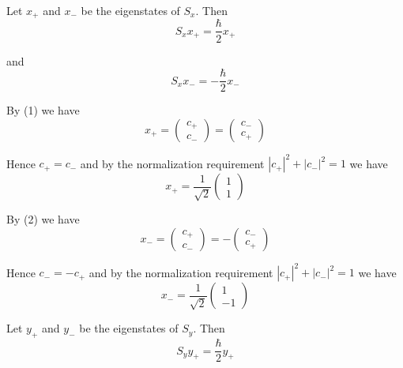 


\bigskip
Let $x_+$ and $x_-$ be the eigenstates of $S_x$. Then
\begin{equation*}
S_xx_+=\frac{\hbar}{2}x_+
\tag{1}
\end{equation*}

and
\begin{equation*}
S_xx_-=-\frac{\hbar}{2}x_-
\tag{2}
\end{equation*}

By (1) we have
\begin{equation*}
x_+=\begin{pmatrix}c_+\\c_-\end{pmatrix}=\begin{pmatrix}c_-\\c_+\end{pmatrix}
\end{equation*}

Hence $c_+=c_-$ and
by the normalization requirement $|c_+|^2+|c_-|^2=1$ we have
\begin{equation*}
x_+=\frac{1}{\sqrt2}\begin{pmatrix}1\\1\end{pmatrix}
\end{equation*}

By (2) we have
\begin{equation*}
x_-=\begin{pmatrix}c_+\\c_-\end{pmatrix}=-\begin{pmatrix}c_-\\c_+\end{pmatrix}
\end{equation*}

Hence $c_-=-c_+$ and
by the normalization requirement $|c_+|^2+|c_-|^2=1$ we have
\begin{equation*}
x_-=\frac{1}{\sqrt2}\begin{pmatrix}1\\-1\end{pmatrix}
\end{equation*}

Let $y_+$ and $y_-$ be the eigenstates of $S_y$. Then
\begin{equation*}
S_yy_+=\frac{\hbar}{2}y_+
\tag{3}
\end{equation*}

